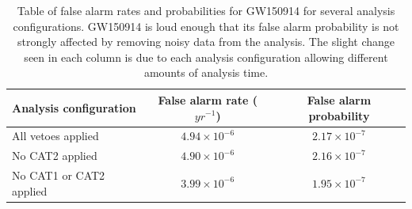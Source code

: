 \begin{table}[!ht]%
  \begin{center}
    \begin{tabular}{lcc}
      \hline
      Analysis configuration & False alarm rate ($yr^{-1}$) & False alarm probability \\ \hline
      All vetoes applied & $4.94\times10^{-6}$ & $2.17\times10^{-7}$ \\
      No CAT2 applied & $4.90\times10^{-6}$ & $2.16\times10^{-7}$ \\
      No CAT1 or CAT2 applied & $3.99\times10^{-6}$ & $1.95\times10^{-7}$ \\
      \hline
    \end{tabular}
  \end{center}
  \caption[GW150914 FAR]{Table of false alarm rates and probabilities for GW150914 for several analysis %
           configurations. GW150914 is loud enough that its false alarm probability %
           is not strongly affected by removing noisy data from the analysis. The slight change seen %
           in each column is due to each analysis configuration allowing different amounts of %
           analysis time. %
           }
  \label{table:150914-far}
\end{table}

